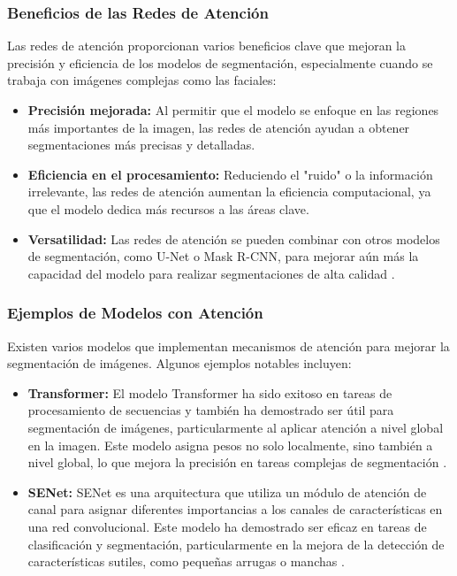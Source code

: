 \subsubsection{Beneficios de las Redes de Atención}  
Las redes de atención proporcionan varios beneficios clave que mejoran la precisión y eficiencia de los modelos de segmentación, especialmente cuando se trabaja con imágenes complejas como las faciales:
\begin{itemize}
    \item \textbf{Precisión mejorada:} Al permitir que el modelo se enfoque en las regiones más importantes de la imagen, las redes de atención ayudan a obtener segmentaciones más precisas y detalladas.
    \item \textbf{Eficiencia en el procesamiento:} Reduciendo el "ruido" o la información irrelevante, las redes de atención aumentan la eficiencia computacional, ya que el modelo dedica más recursos a las áreas clave.
    \item \textbf{Versatilidad:} Las redes de atención se pueden combinar con otros modelos de segmentación, como U-Net o Mask R-CNN, para mejorar aún más la capacidad del modelo para realizar segmentaciones de alta calidad \parencite{autor2021beneficios}.
\end{itemize}

\subsubsection{Ejemplos de Modelos con Atención}  
Existen varios modelos que implementan mecanismos de atención para mejorar la segmentación de imágenes. Algunos ejemplos notables incluyen:
\begin{itemize}
    \item \textbf{Transformer:} El modelo Transformer ha sido exitoso en tareas de procesamiento de secuencias y también ha demostrado ser útil para segmentación de imágenes, particularmente al aplicar atención a nivel global en la imagen. Este modelo asigna pesos no solo localmente, sino también a nivel global, lo que mejora la precisión en tareas complejas de segmentación \parencite{autor2022transformer}.
    \item \textbf{SENet:} SENet es una arquitectura que utiliza un módulo de atención de canal para asignar diferentes importancias a los canales de características en una red convolucional. Este modelo ha demostrado ser eficaz en tareas de clasificación y segmentación, particularmente en la mejora de la detección de características sutiles, como pequeñas arrugas o manchas \parencite{autor2022senet}.
\end{itemize}




